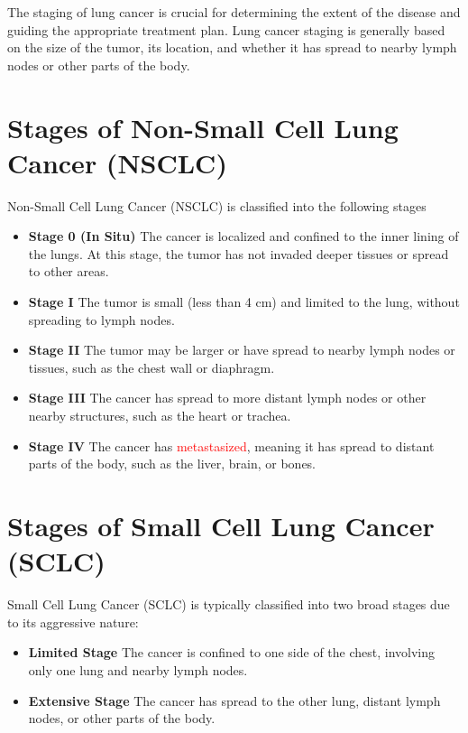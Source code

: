 The staging of lung cancer is crucial for determining the extent of the disease and guiding the appropriate treatment plan. Lung cancer staging is generally based on the size of the tumor, its location, and whether it has spread to nearby lymph nodes or other parts of the body.

\section{Stages of Non-Small Cell Lung Cancer (NSCLC)}
Non-Small Cell Lung Cancer (NSCLC) is classified into the following stages
\begin{highlight}
\begin{itemize}
    \item \textbf{Stage 0 (In Situ)} The cancer is localized and confined to the inner lining of the lungs. At this stage, the tumor has not invaded deeper tissues or spread to other areas.
    \item \textbf{Stage I} The tumor is small (less than 4 cm) and limited to the lung, without spreading to lymph nodes.
    \item \textbf{Stage II} The tumor may be larger or have spread to nearby lymph nodes or tissues, such as the chest wall or diaphragm.
    \item \textbf{Stage III} The cancer has spread to more distant lymph nodes or other nearby structures, such as the heart or trachea.
    \item \textbf{Stage IV} The cancer has \textcolor{red}{metastasized}, meaning it has spread to distant parts of the body, such as the liver, brain, or bones.
\end{itemize}
\end{highlight}

\section{Stages of Small Cell Lung Cancer (SCLC)} 
Small Cell Lung Cancer (SCLC) is typically classified into two broad stages due to its aggressive nature:
\begin{remark}
\begin{itemize}
    \item \textbf{Limited Stage} The cancer is confined to one side of the chest, involving only one lung and nearby lymph nodes.
    \item \textbf{Extensive Stage} The cancer has spread to the other lung, distant lymph nodes, or other parts of the body.
\end{itemize}
\end{remark}

